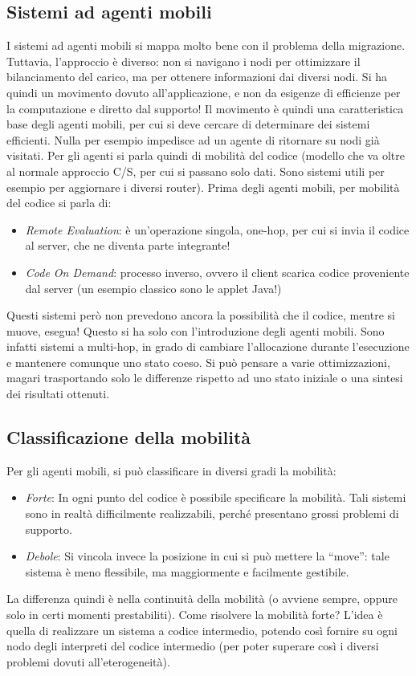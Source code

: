 \subsection{Sistemi ad agenti mobili}
I sistemi ad agenti mobili si mappa molto bene con il problema della migrazione.
Tuttavia, l'approccio è diverso: non si navigano i nodi per ottimizzare il bilanciamento del carico, ma per ottenere 
informazioni dai diversi nodi. Si ha quindi un movimento dovuto all'applicazione, e non da esigenze di efficienze per la
computazione e diretto dal supporto!
Il movimento è quindi una caratteristica base degli agenti mobili, per cui si deve cercare di determinare dei sistemi 
efficienti. Nulla per esempio impedisce ad un agente di ritornare su nodi già visitati.
Per gli agenti si parla quindi di mobilità del codice (modello che va oltre al normale approccio C/S, per cui si passano 
solo dati. Sono sistemi utili per esempio per aggiornare i diversi router). Prima degli agenti mobili, per mobilità
del codice si parla di:
\begin{itemize}
 \item \textit{Remote Evaluation}: è un'operazione singola, one-hop, per cui si invia il codice al server, che ne 
 diventa parte integrante!
 \item \textit{Code On Demand}: processo inverso, ovvero il client scarica codice proveniente dal server (un esempio 
 classico sono le applet Java!)
\end{itemize}
Questi sistemi però non prevedono ancora la possibilità che il codice, mentre si muove, esegua! Questo si ha solo con 
l'introduzione degli agenti mobili. Sono infatti sistemi a multi-hop, in grado di cambiare l'allocazione durante 
l'esecuzione e mantenere comunque uno stato coeso. Si può pensare a varie ottimizzazioni, magari trasportando solo le 
differenze rispetto ad uno stato iniziale o una sintesi dei risultati ottenuti.
\subsection{Classificazione della mobilità}
Per gli agenti mobili, si può classificare in diversi gradi la mobilità:
\begin{itemize}
 \item \textit{Forte}: In ogni punto del codice è possibile specificare la mobilità. Tali sistemi sono in realtà 
 difficilmente realizzabili, perché presentano grossi problemi di supporto.
 \item \textit{Debole}: Si vincola invece la posizione in cui si può mettere la ``move'': tale sistema è meno 
flessibile, ma maggiormente e facilmente gestibile.
\end{itemize}
La differenza quindi è nella continuità della mobilità (o avviene sempre, oppure solo in certi momenti prestabiliti). 
Come risolvere la mobilità forte? L'idea è quella di realizzare un sistema a codice intermedio, potendo così fornire su 
ogni nodo degli interpreti del codice intermedio (per poter superare così i diversi problemi dovuti all'eterogeneità).
